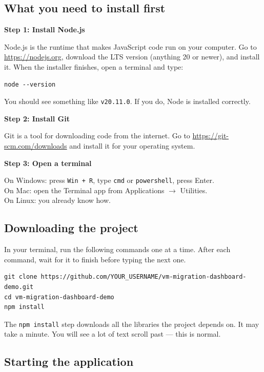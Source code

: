 \documentclass[12pt,a4paper]{article}
\begin{document}
\subsection{What you need to install first}

\textbf{Step 1: Install Node.js}

Node.js is the runtime that makes JavaScript code run on your computer. Go to \url{https://nodejs.org}, download the LTS version (anything 20 or newer), and install it. When the installer finishes, open a terminal and type:

\begin{lstlisting}
node --version
\end{lstlisting}

You should see something like \texttt{v20.11.0}. If you do, Node is installed correctly.

\textbf{Step 2: Install Git}

Git is a tool for downloading code from the internet. Go to \url{https://git-scm.com/downloads} and install it for your operating system.

\textbf{Step 3: Open a terminal}

On Windows: press \texttt{Win + R}, type \texttt{cmd} or \texttt{powershell}, press Enter.\\
On Mac: open the Terminal app from Applications $\to$ Utilities.\\
On Linux: you already know how.

\subsection{Downloading the project}

In your terminal, run the following commands one at a time. After each command, wait for it to finish before typing the next one.

\begin{lstlisting}
git clone https://github.com/YOUR_USERNAME/vm-migration-dashboard-demo.git
cd vm-migration-dashboard-demo
npm install
\end{lstlisting}

The \texttt{npm install} step downloads all the libraries the project depends on. It may take a minute. You will see a lot of text scroll past — this is normal.

\subsection{Starting the application}
\end{document}
